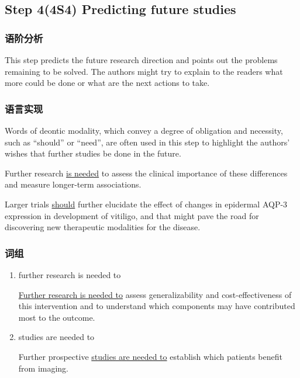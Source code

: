 \documentclass[a4paper]{ctexbook}
\begin{document}
  \subsection{Step 4(4S4) Predicting future studies}
    \subsubsection{语阶分析}

    This step predicts the future research direction and points out the problems remaining to be solved. The authors might try to explain to the readers what more could be done or what are the next actions to take.

    \subsubsection{语言实现}

    Words of deontic modality, which convey a degree of obligation and necessity, such as ``should'' or ``need'', are often used in this step to highlight the authors' wishes that further studies be done in the future.

    \begin{eg}{}
      Further research \uline{is needed} to assess the clinical importance of these differences and measure longer-term associations.  
    \end{eg}

    \begin{eg}{}
      Larger trials \uline{should} further elucidate the effect of changes in epidermal AQP-3 expression in development of vitiligo, and that might pave the road for discovering new therapeutic modalities for the disease. 
    \end{eg}

    \subsubsection{词组}

    \begin{enumerate}
      \item further research is needed to
      \begin{eg}{}
        \uline{Further research is needed to} assess generalizability and cost-effectiveness of this intervention and to understand which components may have contributed most to the outcome. 
      \end{eg}

      \item studies are needed to
      \begin{eg}{}
        Further prospective \uline{studies are needed to} establish which patients benefit from imaging.  
      \end{eg}

    \end{enumerate}
\end{document}
